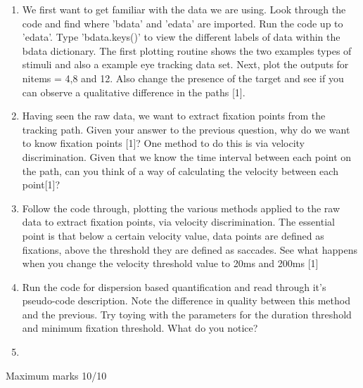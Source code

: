 \documentclass[12pt,english]{scrartcl}
\begin{document}
\begin{enumerate}
\item We first want to get familiar with the data we are using. Look through the code and find where 'bdata' and 'edata' are imported. Run the code up to 'edata'. Type 'bdata.keys()' to view the different labels of data within the bdata dictionary. The first plotting routine shows the two examples types of stimuli and also a example eye tracking data set. Next, plot the outputs for nitems = 4,8 and 12. Also change the presence of the target and see if you can observe a qualitative difference in the paths [1]. \\


 \color{black}
 \item Having seen the raw data, we want to extract fixation points from the tracking path. Given your answer to the previous question, why do we want to know fixation points [1]? One method to do this is via velocity discrimination. Given that we know the time interval between each point on the path, can you think of a way of calculating the velocity between each point[1]? \\
 


 \color{black}
 \item Follow the code through, plotting the various methods applied to the raw data to extract fixation points, via velocity discrimination. The essential point is that below a certain velocity value, data points are defined as fixations, above the threshold they are defined as saccades. See what happens when you change the velocity threshold value to 20ms and 200ms [1]\\
 

 \color{black}
 \item Run the code for dispersion based quantification and read through it's pseudo-code description. Note the difference in quality between this method and the previous. Try toying with the parameters for the duration threshold and minimum fixation threshold. What do you notice? \\
 \item[]
 

 \end{enumerate}
 \color{black}
 Maximum marks 10/10 \\
\end{document}
